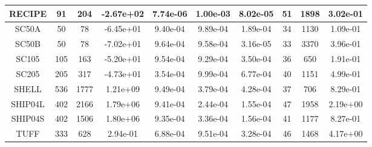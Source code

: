 \documentclass{article}
\begin{document}
\begin{table}
{{\begin{tabular}{cccccccccc}
                RECIPE   & 91   & 204  & -2.67e+02 & 7.74e-06 & 1.00e-03 & 8.02e-05 & 51      & 1898  & 3.02e-01 \\ \hline
                SC50A    & 50   & 78   & -6.45e+01 & 9.40e-04 & 9.89e-04 & 1.89e-04 & 34      & 1130  & 1.09e-01 \\ \hline
                SC50B    & 50   & 78   & -7.02e+01 & 9.64e-04 & 9.58e-04 & 3.16e-05 & 33      & 3370  & 3.96e-01 \\ \hline
                SC105    & 105  & 163  & -5.20e+01 & 9.54e-04 & 9.29e-04 & 3.50e-04 & 36      & 650   & 1.91e-01 \\ \hline
                SC205    & 205  & 317  & -4.73e+01 & 3.54e-04 & 9.99e-04 & 6.77e-04 & 40      & 1151  & 4.99e-01 \\ \hline
                SHELL    & 536  & 1777 & 1.21e+09  & 9.49e-04 & 3.79e-04 & 4.28e-04 & 37      & 706   & 8.29e-01 \\ \hline
                SHIP04L  & 402  & 2166 & 1.79e+06  & 9.41e-04 & 2.44e-04 & 1.55e-04 & 47      & 1958  & 2.19e+00 \\ \hline
                SHIP04S  & 402  & 1506 & 1.80e+06  & 9.35e-04 & 3.36e-04 & 1.56e-04 & 41      & 1177  & 8.27e-01 \\ \hline
                TUFF     & 333  & 628  & 2.94e-01  & 6.88e-04 & 9.51e-04 & 3.28e-04 & 46      & 1468  & 4.17e+00 \\ \hline
            \end{tabular}
        }
    }
    \\
\end{table}
\end{document}
